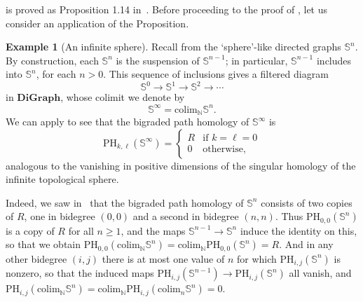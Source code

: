 \documentclass[a4paper, 11 pt, oneside, reqno]{amsart}
\numberwithin{lemma}{section}
\theoremstyle{definition}
\newtheorem{example}[lemma]{Example}
\newcommand{\cn}[1]{\mathbf{#1}}
\newcommand{\colim}{\mathrm{colim}}
\newcommand{\DiGraph}{\cn{DiGraph}}
\newcommand{\PH}{\mathrm{PH}}
\begin{document}
 is proved as Proposition 1.14 in~\cite{DIMZ}. Before proceeding to the proof of , let us consider an application of the Proposition.

\begin{example}[An infinite sphere]
\label{eg:infinite_sphere}
    Recall from  the `sphere'-like directed graphs \(\mathbb{S}^n\). By construction, each \(\mathbb{S}^n\) is the suspension of \(\mathbb{S}^{n-1}\); in particular, \(\mathbb{S}^{n-1}\) includes into \(\mathbb{S}^{n}\), for each \(n > 0\). This sequence of inclusions gives a filtered diagram
    \begin{equation}
    \label{eq:infinite_sphere}
        \mathbb{S}^0 \to \mathbb{S}^{1} \to \mathbb{S}^2 \to \cdots
    \end{equation}
    in \(\DiGraph\), whose colimit we denote by
    \[\mathbb{S}^\infty = \mathrm{colim}_{\mathbb{N}} \mathbb{S}^n.\]
    We can apply  to see that the bigraded path homology of \(\mathbb{S}^\infty\) is
    \[
    \PH_{k,\ell}(\mathbb{S}^\infty) = \begin{cases}
    R & \text{if } k = \ell = 0 \\
    0 &\text{otherwise,}
    \end{cases}
    \]
    analogous to the vanishing in positive dimensions of the singular homology of the infinite topological sphere.

    Indeed, we saw in~ that the bigraded path
    homology of $\mathbb{S}^n$ consists of two copies of $R$,
    one in bidegree $(0,0)$ and a second in bidegree $(n,n)$.
    Thus $\PH_{0,0}(\mathbb{S}^n)$ is a copy of $R$ 
    for all $n\geq 1$, and the maps $\mathbb{S}^{n-1}\to \mathbb{S}^n$ induce the identity on this, so that we obtain
    $\PH_{0,0}(\colim_\mathbb{N}\mathbb{S}^n)=
    \colim_\mathbb{N}\PH_{0,0}(\mathbb{S}^n)=R$.
    And in any other bidegree $(i,j)$ there is at most one value
    of $n$ for which $\PH_{i,j}(\mathbb{S}^n)$ is nonzero,
    so that the induced maps 
    $\PH_{i,j}(\mathbb{S}^{n-1})\to \PH_{i,j}(\mathbb{S}^n)$
    all vanish, and 
    $\PH_{i,j}(\colim_\mathbb{N}\mathbb{S}^n)=
    \colim_\mathbb{N}\PH_{i,j}(\colim_n\mathbb{S}^n)=0$.
\end{example}
\end{document}
